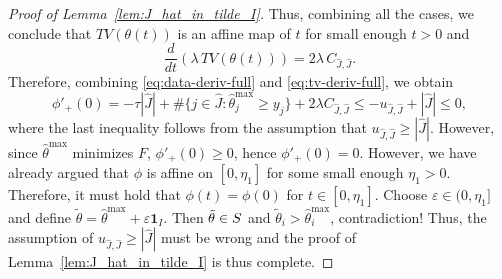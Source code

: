 \documentclass[11pt]{article}
\newcommand{\one}{\mathbf 1}
\newcommand{\cS}{\mathcal{S}}
\theoremstyle{plain}
\theoremstyle{definition}
\theoremstyle{remark}
\begin{document}
\begin{appendix}
\begin{proof}[Proof of Lemma~\ref{lem:J_hat_in_tilde_I}]
Thus, combining all the cases, we conclude that $TV(\theta(t))$ is an affine map of $t$ for small enough $t>0$ and 
\begin{equation}\label{eq:tv-deriv-full}
    \frac{d}{dt}\left(\lambda\,TV(\theta(t))\right)=2\lambda\,C_{\hat{J},\hat{J}}.
\end{equation}
Therefore, combining \eqref{eq:data-deriv-full} and \eqref{eq:tv-deriv-full}, we obtain
\[\phi'_{+}(0)=-\tau|\hat{J}|+\#\{j\in \hat{J}:\hat\theta^{\max}_j\ge y_j\}+2\lambda C_{\hat{J},\hat{J}}\leq -u_{\hat{J},\hat{J}}+|\hat{J}|\leq 0,\]
where the last inequality follows from the assumption that $u_{\hat{J},\hat{J}}\geq |\hat{J}|.$ However, since $\hat\theta^{\max}$ minimizes $F$, $\phi'_+(0)\ge 0$,
hence $\phi'_+(0)=0$.
However, we have already argued that $\phi$ is affine on $[0,\eta_1]$ for some small enough $\eta_1>0$. Therefore, it must hold that $\phi(t)=\phi(0)$ for $t\in[0,\eta_1]$. Choose $\varepsilon\in(0,\eta_1]$ and define
$\tilde\theta=\hat\theta^{\max}+\varepsilon\one_I$.
Then $\tilde\theta\in\mathcal \cS$ and
$\tilde\theta_i>\hat\theta_i^{\max}$,
contradiction! Thus, the assumption of $u_{\hat{J},\hat{J}}\geq |\hat{J}|$ must be wrong and the proof of Lemma~\ref{lem:J_hat_in_tilde_I} is thus complete.
\end{proof}

\end{appendix}
\end{document}
